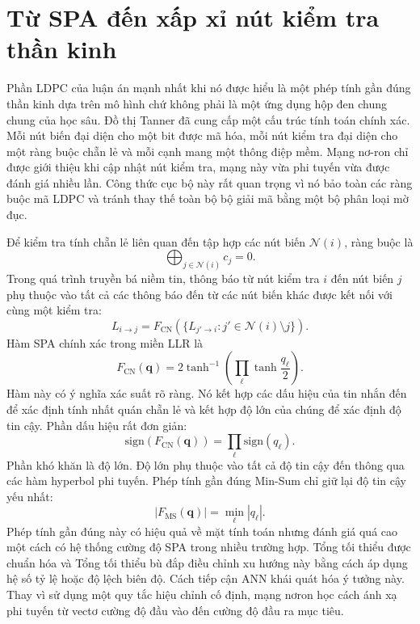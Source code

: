 \section{Từ SPA đến xấp xỉ nút kiểm tra thần kinh}
Phần LDPC của luận án mạnh nhất khi nó được hiểu là một phép tính gần đúng thần kinh dựa trên mô hình chứ không phải là một ứng dụng hộp đen chung chung của học sâu. Đồ thị Tanner đã cung cấp một cấu trúc tính toán chính xác. Mỗi nút biến đại diện cho một bit được mã hóa, mỗi nút kiểm tra đại diện cho một ràng buộc chẵn lẻ và mỗi cạnh mang một thông điệp mềm. Mạng nơ-ron chỉ được giới thiệu khi cập nhật nút kiểm tra, mạng này vừa phi tuyến vừa được đánh giá nhiều lần. Công thức cục bộ này rất quan trọng vì nó bảo toàn các ràng buộc mã LDPC và tránh thay thế toàn bộ bộ giải mã bằng một bộ phân loại mờ đục.

Để kiểm tra tính chẵn lẻ liên quan đến tập hợp các nút biến $\mathcal{N}(i)$, ràng buộc là
\begin{equation}
  \bigoplus_{j\in\mathcal{N}(i)} c_j=0.
\end{equation}
Trong quá trình truyền bá niềm tin, thông báo từ nút kiểm tra $i$ đến nút biến $j$ phụ thuộc vào tất cả các thông báo đến từ các nút biến khác được kết nối với cùng một kiểm tra:
\begin{equation}
  L_{i\rightarrow j}=F_{\mathrm{CN}}\left(\{L_{j'\rightarrow i}:j'\in\mathcal{N}(i)\setminus j\}\right).
\end{equation}
Hàm SPA chính xác trong miền LLR là
\begin{equation}
  F_{\mathrm{CN}}(\mathbf{q})=
  2\tanh^{-1}\left(\prod_{\ell}\tanh\frac{q_\ell}{2}\right).
\end{equation}
Hàm này có ý nghĩa xác suất rõ ràng. Nó kết hợp các dấu hiệu của tin nhắn đến để xác định tính nhất quán chẵn lẻ và kết hợp độ lớn của chúng để xác định độ tin cậy. Phần dấu hiệu rất đơn giản:
\begin{equation}
  \mathrm{sign}\left(F_{\mathrm{CN}}(\mathbf{q})\right)
  =
  \prod_{\ell}\mathrm{sign}(q_\ell).
\end{equation}
Phần khó khăn là độ lớn. Độ lớn phụ thuộc vào tất cả độ tin cậy đến thông qua các hàm hyperbol phi tuyến. Phép tính gần đúng Min-Sum chỉ giữ lại độ tin cậy yếu nhất:
\begin{equation}
  |F_{\mathrm{MS}}(\mathbf{q})|=\min_{\ell}|q_\ell|.
\end{equation}
Phép tính gần đúng này có hiệu quả về mặt tính toán nhưng đánh giá quá cao một cách có hệ thống cường độ SPA trong nhiều trường hợp. Tổng tối thiểu được chuẩn hóa và Tổng tối thiểu bù đắp điều chỉnh xu hướng này bằng cách áp dụng hệ số tỷ lệ hoặc độ lệch biên độ. Cách tiếp cận ANN khái quát hóa ý tưởng này. Thay vì sử dụng một quy tắc hiệu chỉnh cố định, mạng nơron học cách ánh xạ phi tuyến từ vectơ cường độ đầu vào đến cường độ đầu ra mục tiêu.

